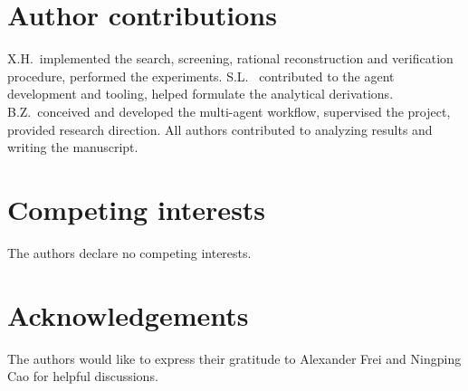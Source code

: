 \documentclass[pdflatex,sn-nature]{sn-jnl}%
\theoremstyle{thmstyleone}%
\theoremstyle{thmstyletwo}%
\theoremstyle{thmstylethree}%
\begin{document}
\section*{Author contributions}
X.H.\ implemented the search, screening, rational reconstruction and verification procedure, performed the experiments. S.L.\ %
contributed to the agent development and tooling, helped formulate the analytical derivations. B.Z.\ conceived and developed the multi-agent workflow, supervised the project, provided research direction. All authors contributed to analyzing results and writing the manuscript.

\section*{Competing interests}
The authors declare no competing interests.

\section*{Acknowledgements}
The authors would like to express their gratitude to Alexander Frei and Ningping Cao for helpful
discussions.
\end{document}
